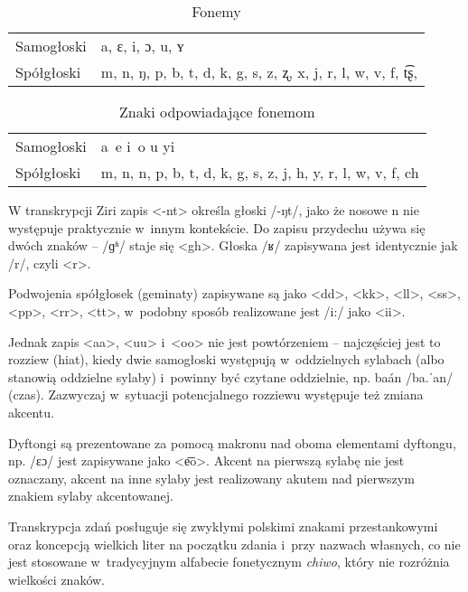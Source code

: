 \begin{spacing}{1.1}
\begin{table}[h]
\centering
\caption{Fonemy}
\begin{tabular}{ll}
	Samogłoski & a, ɛ, i, ɔ, u, ʏ \\
	Spółgłoski & m, n, ŋ, p, b, t, d, k, g, s, z, ʐ, x, j, r, l, w, v, f, t͡ʂ, \\
\end{tabular}
\label{tab:phonemes}
\end{table}

\begin{table}[h]
\centering
\caption{Znaki odpowiadające fonemom}
\begin{tabular}{ll}
	Samogłoski & a~e i~o u yi \\
	Spółgłoski & m, n, n, p, b, t, d, k, g, s, z, j, h, y, r, l, w, v, f, ch \\
\end{tabular}
\label{tab:chars}
\end{table}

W transkrypcji Ziri zapis <-nt> określa głoski /-ŋt/, jako że nosowe n nie 
występuje praktycznie w~innym kontekście. Do zapisu przydechu używa się dwóch 
znaków -- /ɡʱ/ staje się <gh>. Głoska /ʁ/ zapisywana jest identycznie jak /r/, 
czyli <r>.

\skipline

Podwojenia spółgłosek (geminaty) zapisywane są jako <dd>, <kk>, <ll>, <ss>, 
<pp>, <rr>, <tt>, w~podobny sposób realizowane jest /i:/ jako <ii>.

Jednak zapis <aa>, <uu> i~<oo> nie jest powtórzeniem -- najczęściej jest to 
rozziew (hiat), kiedy dwie samogłoski występują w~oddzielnych sylabach (albo 
stanowią oddzielne sylaby) i~powinny być czytane oddzielnie, np. baán /ba.ˈan/
 (czas). Zazwyczaj w~sytuacji potencjalnego rozziewu występuje też zmiana 
 akcentu.

Dyftongi są prezentowane za pomocą makronu nad oboma elementami dyftongu, np.
 /ɛɔ/ jest zapisywane jako <e͞o>. Akcent na pierwszą sylabę nie jest oznaczany, 
 akcent na inne sylaby jest realizowany akutem nad pierwszym znakiem sylaby 
 akcentowanej.

Transkrypcja zdań posługuje się zwykłymi polskimi znakami przestankowymi oraz 
koncepcją wielkich liter na początku zdania i~przy nazwach własnych, co nie 
jest stosowane w~tradycyjnym alfabecie fonetycznym \emph{chiwo}, który nie 
rozróżnia wielkości znaków.


\end{spacing}
